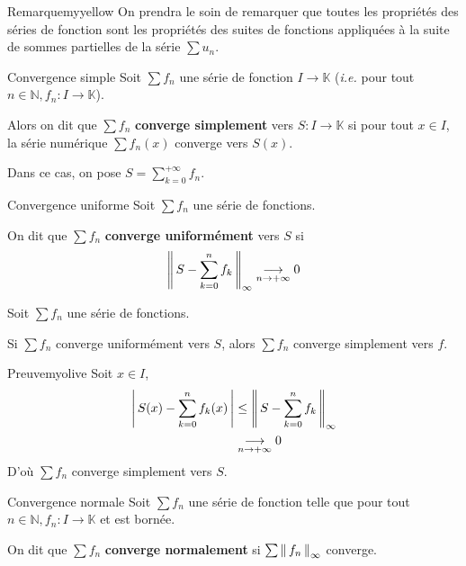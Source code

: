     \begin{omed}{Remarque}{myyellow}
        On prendra le soin de remarquer que toutes les propriétés des séries de fonction sont les propriétés des suites de fonctions appliquées à la suite de sommes partielles de la série $\sum u_n$.
    \end{omed}

    \begin{defi}{Convergence simple}{}
        Soit $\sum f_n$ une série de fonction $I \rightarrow \mathbb{K}$ (\textit{i.e.} pour tout $n \in \mathbb{N}, f_n : I \rightarrow \mathbb{K}$).

        Alors on dit que $\sum f_n$ \textbf{converge simplement} vers $S : I \rightarrow \mathbb{K}$ si pour tout $x \in I$, la série numérique $\sum f_n(x)$ converge vers $S(x)$.

        Dans ce cas, on pose $S = \sum_{k=0}^{+\infty} f_n$.
    \end{defi}

    \begin{defi}{Convergence uniforme}{}
        Soit $\sum f_n$ une série de fonctions. 

        On dit que $\sum f_n$ \textbf{converge uniformément} vers $S$ si 
        \[ \left\lVert\,S - \sum_{k=0}^{n} f_k\,\right\rVert_{\infty} \underset{n \rightarrow +\infty}{\longrightarrow} 0 \] 
    \end{defi}

    \begin{prop}{}{}
        Soit $\sum f_n$ une série de fonctions. 

        Si $\sum f_n$ converge uniformément vers $S$, alors $\sum f_n$ converge simplement vers $f$.
    \end{prop}

    \begin{demo}{Preuve}{myolive}
        Soit $x \in I$, 
        \begin{align*}
            \left\lvert \,S(x) - \sum_{k=0}^{n}f_k(x) \, \right\rvert 
            &\leq \left\lVert\,S - \sum_{k=0}^{n} f_k\,\right\rVert_{\infty} \\
            & \underset{n \rightarrow +\infty}{\longrightarrow} 0 
        \end{align*}
        D’où $\sum f_n$ converge simplement vers $S$.
    \end{demo}

    \begin{defi}{Convergence normale}{}
        Soit $\sum f_n$ une série de fonction telle que pour tout $n \in \mathbb{N}, f_n : I \rightarrow \mathbb{K}$ et est bornée.

        On dit que $\sum f_n$ \textbf{converge normalement} si $\sum \left\lVert\,f_n\,\right\rVert_{\infty}$ converge.
    \end{defi}

